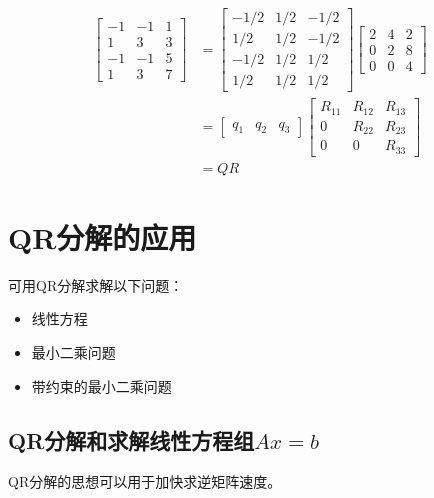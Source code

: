 \begin{example}
    $$
\begin{aligned}
\left[\begin{array}{rrr}
-1 & -1 & 1 \\
1 & 3 & 3 \\
-1 & -1 & 5 \\
1 & 3 & 7
\end{array}\right] &=\left[\begin{array}{rrr}
-1 / 2 & 1 / 2 & -1 / 2 \\
1 / 2 & 1 / 2 & -1 / 2 \\
-1 / 2 & 1 / 2 & 1 / 2 \\
1 / 2 & 1 / 2 & 1 / 2
\end{array}\right]\left[\begin{array}{rrr}
2 & 4 & 2 \\
0 & 2 & 8 \\
0 & 0 & 4
\end{array}\right] \\
&=\left[\begin{array}{lll}
q_{1} & q_{2} & q_{3}
\end{array}\right]\left[\begin{array}{ccc}
R_{11} & R_{12} & R_{13} \\
0 & R_{22} & R_{23} \\
0 & 0 & R_{33}
\end{array}\right] \\
&=Q R
\end{aligned}
$$
\end{example}

\section{QR分解的应用}

可用QR分解求解以下问题：

\begin{itemize}
    \item 线性方程
    \item 最小二乘问题
    \item 带约束的最小二乘问题
\end{itemize}

\subsection{QR分解和求解线性方程组$Ax = b$}

QR分解的思想可以用于加快求逆矩阵速度。

